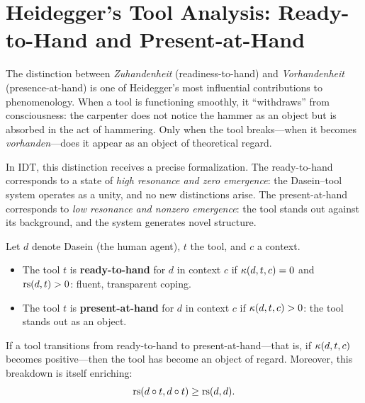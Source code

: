 
\section{Heidegger's Tool Analysis: Ready-to-Hand and Present-at-Hand}

The distinction between \textit{Zuhandenheit} (readiness-to-hand) and
\textit{Vorhandenheit} (presence-at-hand) is one of Heidegger's most influential
contributions to phenomenology.  When a tool is functioning smoothly, it
``withdraws'' from consciousness: the carpenter does not notice the hammer as an
object but is absorbed in the act of hammering.  Only when the tool breaks---when
it becomes \textit{vorhanden}---does it appear as an object of theoretical regard.

In IDT, this distinction receives a precise formalization.  The ready-to-hand
corresponds to a state of \emph{high resonance and zero emergence}: the Dasein--tool
system operates as a unity, and no new distinctions arise.  The present-at-hand
corresponds to \emph{low resonance and nonzero emergence}: the tool stands out
against its background, and the system generates novel structure.

\begin{definition}
\label{def:ready-present-at-hand}
Let $d$ denote Dasein (the human agent), $t$ the tool, and $c$ a context.
\begin{itemize}
\item The tool $t$ is \textbf{ready-to-hand} for $d$ in context $c$ if
$\kappa(d, t, c) = 0$ and $\mathrm{rs}(d, t) > 0$: fluent, transparent coping.
\item The tool $t$ is \textbf{present-at-hand} for $d$ in context $c$ if
$\kappa(d, t, c) > 0$: the tool stands out as an object.
\end{itemize}
\end{definition}

\begin{theorem}
\label{thm:breakdown-reveals}
If a tool transitions from ready-to-hand to present-at-hand---that is, if
$\kappa(d, t, c)$ becomes positive---then the tool has become an object of
regard.  Moreover, this breakdown is itself enriching:
\[
\mathrm{rs}(d \circ t, d \circ t) \geq \mathrm{rs}(d, d).
\]
\end{theorem}

